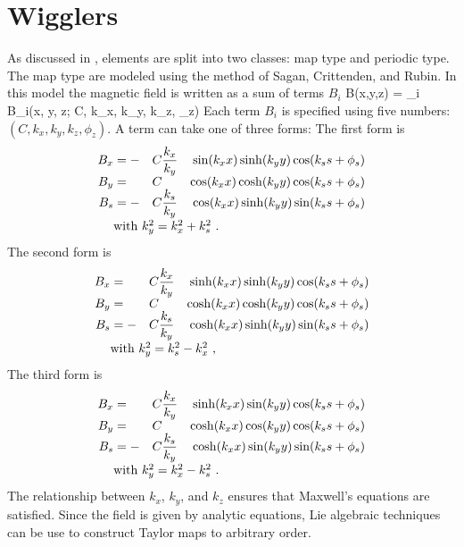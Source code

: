 \section{Wigglers}
\label{s:wiggler_phys}

As discussed in , \bmad {} elements are
split into two classes: map type and periodic type. The map type
 are modeled using the method of Sagan, Crittenden, and
Rubin\cite{b:wiggler}. In this model the magnetic field is written as
a sum of terms $B_i$
\Begineq
  B(x,y,z) = \sum_i B_i(x, y, z; C, k_x, k_y, k_z, \phi_z)
\Endeq 
Each term $B_i$ is specified using five numbers: 
$(C, k_x, k_y, k_z, \phi_z)$. A term can take one of three forms: The first
form is
\begin{alignat}{4}
  B_x &= -&C &\dfrac{k_x}{k_y} & \sin(\kxx) \sinh(\kyy) \cos(\ksss) \CRNEG
  B_y &=  &C &                 & \cos(\kxx) \cosh(\kyy) \cos(\ksss) \CRNEG
  B_s &= -&C &\dfrac{k_s}{k_y} & \cos(\kxx) \sinh(\kyy) \sin(\ksss) \CRneg
  & \makebox[1pt][l]{with $k_y^2 = k_x^2 + k_s^2$ .} &&&  \label{f1}
\end{alignat}
The second form is
\begin{alignat}{4}
  B_x &=  &C &\dfrac{k_x}{k_y} & \sinh(\kxx) \sinh(\kyy) \cos(\ksss) \CRNEG
  B_y &=  &C &                 & \cosh(\kxx) \cosh(\kyy) \cos(\ksss) \CRNEG
  B_s &= -&C &\dfrac{k_s}{k_y} & \cosh(\kxx) \sinh(\kyy) \sin(\ksss) \CRneg
  & \makebox[1pt][l]{with $k_y^2 = k_s^2 - k_x^2$ ,} &&&  \label{f2}
\end{alignat}
The third form is
\begin{alignat}{4}
  B_x &=  &C &\dfrac{k_x}{k_y} & \sinh(\kxx) \sin(\kyy) \cos(\ksss) \CRNEG
  B_y &=  &C &                 & \cosh(\kxx) \cos(\kyy) \cos(\ksss) \CRNEG
  B_s &= -&C &\dfrac{k_s}{k_y} & \cosh(\kxx) \sin(\kyy) \sin(\ksss) \CRneg
  & \makebox[1pt][l]{with $k_y^2 = k_x^2 - k_s^2$ .} &&& \label{f3}
\end{alignat}
The relationship between $k_x$, $k_y$, and $k_z$ ensures that
Maxwell's equations are satisfied. Since the field is given by
analytic equations, Lie algebraic techniques can be use to construct
Taylor maps to arbitrary order.

